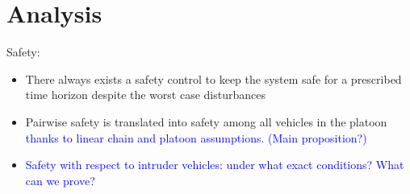 \section{Analysis}
Safety: 
\begin{itemize}
\item There always exists a safety control to keep the system safe for a prescribed time horizon despite the worst case disturbances 
\item Pairwise safety is translated into safety among all vehicles in the platoon \textcolor{blue}{thanks to linear chain and platoon assumptions. (Main proposition?)}
\item \textcolor{blue}{Safety with respect to intruder vehicles: under what exact conditions? What can we prove?}
\end{itemize}
